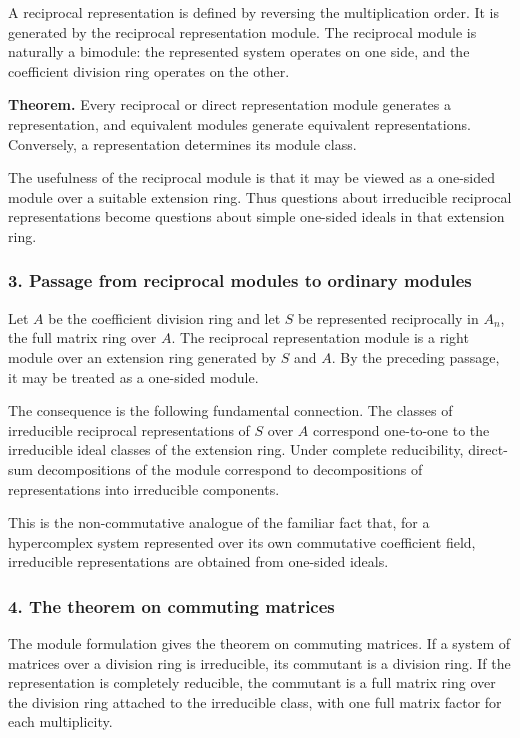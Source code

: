 \documentclass[
  11pt,
]{article}
\begin{document}
A reciprocal representation is defined by reversing the multiplication
order. It is generated by the reciprocal representation module. The
reciprocal module is naturally a bimodule: the represented system
operates on one side, and the coefficient division ring operates on the
other.

\textbf{Theorem.} Every reciprocal or direct representation module
generates a representation, and equivalent modules generate equivalent
representations. Conversely, a representation determines its module
class.

The usefulness of the reciprocal module is that it may be viewed as a
one-sided module over a suitable extension ring. Thus questions about
irreducible reciprocal representations become questions about simple
one-sided ideals in that extension ring.

\subsubsection{3. Passage from reciprocal modules to ordinary
modules}\label{passage-from-reciprocal-modules-to-ordinary-modules}

Let \(A\) be the coefficient division ring and let \(S\) be represented
reciprocally in \(A_n\), the full matrix ring over \(A\). The reciprocal
representation module is a right module over an extension ring generated
by \(S\) and \(A\). By the preceding passage, it may be treated as a
one-sided module.

The consequence is the following fundamental connection. The classes of
irreducible reciprocal representations of \(S\) over \(A\) correspond
one-to-one to the irreducible ideal classes of the extension ring. Under
complete reducibility, direct-sum decompositions of the module
correspond to decompositions of representations into irreducible
components.

This is the non-commutative analogue of the familiar fact that, for a
hypercomplex system represented over its own commutative coefficient
field, irreducible representations are obtained from one-sided ideals.

\subsubsection{4. The theorem on commuting
matrices}\label{the-theorem-on-commuting-matrices}

The module formulation gives the theorem on commuting matrices. If a
system of matrices over a division ring is irreducible, its commutant is
a division ring. If the representation is completely reducible, the
commutant is a full matrix ring over the division ring attached to the
irreducible class, with one full matrix factor for each multiplicity.
\end{document}
